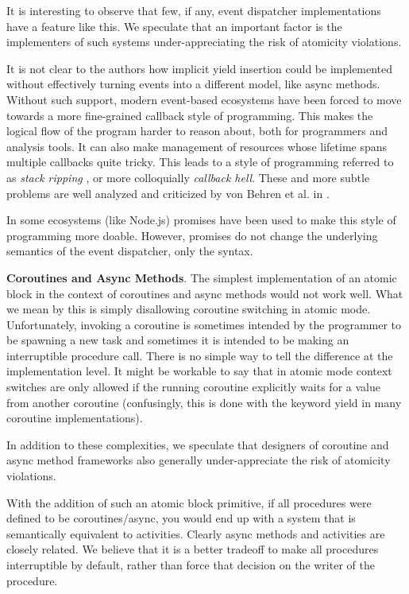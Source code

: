 \documentclass[preprint, 10pt, numbers]{sigplanconf}
\begin{document}
It is interesting to observe that few, if any, event dispatcher implementations have a feature like this.
We speculate that an important factor is the implementers of such systems under-appreciating the risk of atomicity violations.

It is not clear to the authors how implicit yield insertion could be implemented without effectively turning events into a different model, like async methods.
Without such support, modern event-based ecosystems have been forced to move towards a more fine-grained callback style of programming.
This makes the logical flow of the program harder to reason about, both for programmers and analysis tools.
It can also make management of resources whose lifetime spans multiple callbacks quite tricky.
This leads to a style of programming referred to as \emph{stack ripping} \cite{Adya2002}, or more colloquially \emph{callback hell}.
These and more subtle problems are well analyzed and criticized by von Behren et al. in \cite{Behren2003a}.

In some ecosystems (like Node.js) promises have been used to make this style of programming more doable.
However, promises do not change the underlying semantics of the event dispatcher, only the syntax.

\textbf{Coroutines and Async Methods}.
The simplest implementation of an atomic block in the context of coroutines and async methods would not work well.
What we mean by this is simply disallowing coroutine switching in atomic mode.
Unfortunately, invoking a coroutine is sometimes intended by the programmer to be spawning a new task and sometimes it is intended to be making an interruptible procedure call.
There is no simple way to tell the difference at the implementation level.
It might be workable to say that in atomic mode context switches are only allowed if the running coroutine explicitly waits for a value from another coroutine (confusingly, this is done with the keyword yield in many coroutine implementations).

In addition to these complexities, we speculate that designers of coroutine and async method frameworks also generally under-appreciate the risk of atomicity violations.

With the addition of such an atomic block primitive, if all procedures were defined to be coroutines/async, you would end up with a system that is semantically equivalent to activities.
Clearly async methods and activities are closely related.
We believe that it is a better tradeoff to make all procedures interruptible by default, rather than force that decision on the writer of the procedure.
\end{document}
